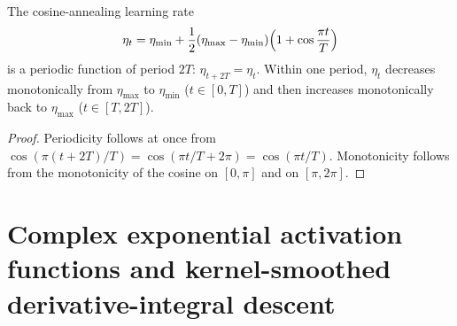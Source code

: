 \begin{proposition}\label{prop:cosine_annealing_period_agent}
The cosine-annealing learning rate
\[
\eta_t = \eta_{\min} + \frac{1}{2}(\eta_{\max} - \eta_{\min})\Bigl(1 + \cos\frac{\pi t}{T}\Bigr)
\]
is a periodic function of period $2T$: $\eta_{t+2T} = \eta_t$. Within one period, $\eta_t$ decreases monotonically from $\eta_{\max}$ to $\eta_{\min}$ ($t \in [0,T]$) and then increases monotonically back to $\eta_{\max}$ ($t \in [T,2T]$).
\end{proposition}

\begin{proof}
Periodicity follows at once from $\cos(\pi(t+2T)/T) = \cos(\pi t/T + 2\pi) = \cos(\pi t/T)$. Monotonicity follows from the monotonicity of the cosine on $[0,\pi]$ and on $[\pi,2\pi]$.
\end{proof}

\section{Complex exponential activation functions and kernel-smoothed derivative-integral descent}


